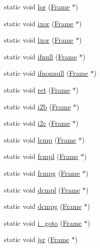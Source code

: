 \begin{DoxyCompactItemize}
\item 
static void \hyperlink{class_instruction_impl_aaa16b6c98968aeb60c1766342451fa1a}{lor} (\hyperlink{struct_frame}{Frame} $\ast$)
\item 
static void \hyperlink{class_instruction_impl_a0a75ee32238dad1c3519105421cadcdf}{ixor} (\hyperlink{struct_frame}{Frame} $\ast$)
\item 
static void \hyperlink{class_instruction_impl_ae9926307b3033deae875f4eb9f194b99}{lxor} (\hyperlink{struct_frame}{Frame} $\ast$)
\item 
static void \hyperlink{class_instruction_impl_a8dfdc3c41cd2acf2ebe89515580cdedf}{ifnull} (\hyperlink{struct_frame}{Frame} $\ast$)
\item 
static void \hyperlink{class_instruction_impl_ad7d4d8946f8f93d0d3d598b5a2df6842}{ifnonnull} (\hyperlink{struct_frame}{Frame} $\ast$)
\item 
static void \hyperlink{class_instruction_impl_a97558ae7b4229682d4b59e532ac43eff}{ret} (\hyperlink{struct_frame}{Frame} $\ast$)
\item 
static void \hyperlink{class_instruction_impl_ae7480dbfbbe5442165d5f4583e02f3e0}{i2b} (\hyperlink{struct_frame}{Frame} $\ast$)
\item 
static void \hyperlink{class_instruction_impl_a4c7e4bc9bfb33ace6ad032e2374dec43}{i2c} (\hyperlink{struct_frame}{Frame} $\ast$)
\item 
static void \hyperlink{class_instruction_impl_a61ab3dd92d4614384639e1b87d68c475}{lcmp} (\hyperlink{struct_frame}{Frame} $\ast$)
\item 
static void \hyperlink{class_instruction_impl_a219783f87718d30f5217a0880e0fcf3a}{fcmpl} (\hyperlink{struct_frame}{Frame} $\ast$)
\item 
static void \hyperlink{class_instruction_impl_a0be88f4e1a6ac96aa3f7ec8be70b8e9d}{fcmpg} (\hyperlink{struct_frame}{Frame} $\ast$)
\item 
static void \hyperlink{class_instruction_impl_a66faf1b8eb1dd5259c43e886b5d6c5b2}{dcmpl} (\hyperlink{struct_frame}{Frame} $\ast$)
\item 
static void \hyperlink{class_instruction_impl_a1e6ef3436841be635e0b95bc44771daa}{dcmpg} (\hyperlink{struct_frame}{Frame} $\ast$)
\item 
static void \hyperlink{class_instruction_impl_aa3dd4a4b0b07831942cfe4be31419b9d}{i\+\_\+goto} (\hyperlink{struct_frame}{Frame} $\ast$)
\item 
static void \hyperlink{class_instruction_impl_a4787ad60f174f06d0135baabbdaef960}{jsr} (\hyperlink{struct_frame}{Frame} $\ast$)

\end{DoxyCompactItemize}
